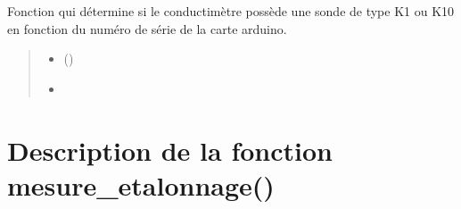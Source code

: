 \documentclass[letterpaper,10pt,french]{sphinxmanual}
\begin{document}
\begin{fulllineitems}
\label{\detokenize{Documentation:lib_conductimetre.type_conductimetre}}
\pysigstartsignatures
{}
\pysigstopsignatures
\sphinxAtStartPar
Fonction qui détermine si le conductimètre possède une sonde de type K1 ou K10 en fonction du numéro de série de la carte arduino.
\begin{quote}\begin{description}
\sphinxAtStartPar
\begin{itemize}
\item {} 
\sphinxAtStartPar
{} ()

\item {} 
\sphinxAtStartPar
{}

\end{itemize}


\end{description}\end{quote}

\end{fulllineitems}



\section{Description de la fonction mesure\_etalonnage()}
\label{\detokenize{Documentation:description-de-la-fonction-mesure-etalonnage}}
\end{document}

